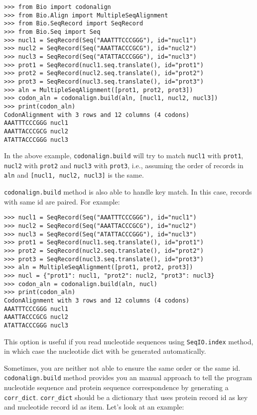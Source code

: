 \documentclass{article}
\begin{document}
\begin{verbatim}
>>> from Bio import codonalign
>>> from Bio.Align import MultipleSeqAlignment
>>> from Bio.SeqRecord import SeqRecord
>>> from Bio.Seq import Seq
>>> nucl1 = SeqRecord(Seq("AAATTTCCCGGG"), id="nucl1")
>>> nucl2 = SeqRecord(Seq("AAATTACCCGCG"), id="nucl2")
>>> nucl3 = SeqRecord(Seq("ATATTACCCGGG"), id="nucl3")
>>> prot1 = SeqRecord(nucl1.seq.translate(), id="prot1")
>>> prot2 = SeqRecord(nucl2.seq.translate(), id="prot2")
>>> prot3 = SeqRecord(nucl3.seq.translate(), id="prot3")
>>> aln = MultipleSeqAlignment([prot1, prot2, prot3])
>>> codon_aln = codonalign.build(aln, [nucl1, nucl2, nucl3])
>>> print(codon_aln)
CodonAlignment with 3 rows and 12 columns (4 codons)
AAATTTCCCGGG nucl1
AAATTACCCGCG nucl2
ATATTACCCGGG nucl3
\end{verbatim}

In the above example, \texttt{codonalign.build} will try to match
\texttt{nucl1} with \texttt{prot1}, \texttt{nucl2} with \texttt{prot2}
and \texttt{nucl3} with \texttt{prot3}, i.e., assuming the order of
records in \texttt{aln} and \texttt{{[}nucl1, nucl2, nucl3{]}} is the
same.

\texttt{codonalign.build} method is also able to handle key match. In
this case, records with same id are paired. For example:

\begin{verbatim}
>>> nucl1 = SeqRecord(Seq("AAATTTCCCGGG"), id="nucl1")
>>> nucl2 = SeqRecord(Seq("AAATTACCCGCG"), id="nucl2")
>>> nucl3 = SeqRecord(Seq("ATATTACCCGGG"), id="nucl3")
>>> prot1 = SeqRecord(nucl1.seq.translate(), id="prot1")
>>> prot2 = SeqRecord(nucl2.seq.translate(), id="prot2")
>>> prot3 = SeqRecord(nucl3.seq.translate(), id="prot3")
>>> aln = MultipleSeqAlignment([prot1, prot2, prot3])
>>> nucl = {"prot1": nucl1, "prot2": nucl2, "prot3": nucl3}
>>> codon_aln = codonalign.build(aln, nucl)
>>> print(codon_aln)
CodonAlignment with 3 rows and 12 columns (4 codons)
AAATTTCCCGGG nucl1
AAATTACCCGCG nucl2
ATATTACCCGGG nucl3
\end{verbatim}

This option is useful if you read nucleotide sequences using
\texttt{SeqIO.index} method, in which case the nucleotide dict with be
generated automatically.

Sometimes, you are neither not able to ensure the same order or the same
id. \texttt{codonalign.build} method provides you an manual approach to
tell the program nucleotide sequence and protein sequence correspondence
by generating a \texttt{corr\_dict}. \texttt{corr\_dict} should be a
dictionary that uses protein record id as key and nucleotide record id
as item. Let's look at an example:
\end{document}
